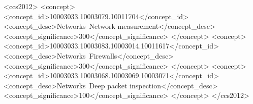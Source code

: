 \documentclass{sig-alternate-05-2015}
\begin{document}
\maketitle



%
%
\begin{CCSXML}
<ccs2012>
<concept>
<concept_id>10003033.10003079.10011704</concept_id>
<concept_desc>Networks~Network measurement</concept_desc>
<concept_significance>300</concept_significance>
</concept>
<concept>
<concept_id>10003033.10003083.10003014.10011617</concept_id>
<concept_desc>Networks~Firewalls</concept_desc>
<concept_significance>300</concept_significance>
</concept>
<concept>
<concept_id>10003033.10003068.10003069.10003071</concept_id>
<concept_desc>Networks~Deep packet inspection</concept_desc>
<concept_significance>100</concept_significance>
</concept>
</ccs2012>
\end{CCSXML}


%
%

%
%
\printccsdesc











%

\end{document}
